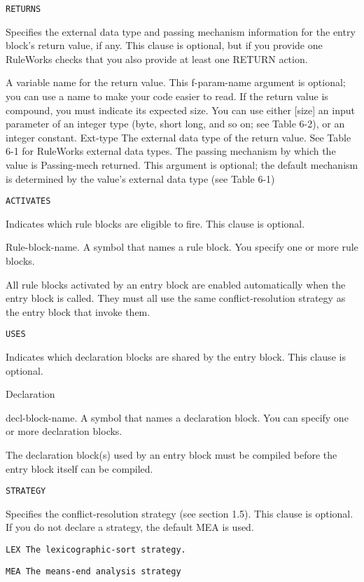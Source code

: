 \tt{RETURNS}

Specifies the external data type and passing mechanism
information for the entry block's return value, if any. This
clause is optional, but if you provide one RuleWorks checks
that you also provide at least one RETURN action.

A variable name for the return value. This
f-param-name argument is optional; you can use a name to make
your code easier to read.
If the return value is compound, you must
indicate its expected size. You can use either
[size]       an input parameter of an integer type (byte,
short long, and so on; see Table 6-2), or an
integer constant.
Ext-type     The external data type of the return value. See
Table 6-1 for RuleWorks external data types.
The passing mechanism by which the value is
Passing-mech returned. This argument is optional; the default
mechanism is determined by the value's external
data type (see Table 6-1)

\tt{ACTIVATES}

Indicates which rule blocks are eligible to fire. This clause
is optional.

Rule-block-name. A symbol that names a rule block. You
specify one or more rule blocks.

All rule blocks activated by an entry block are enabled
automatically when the entry block is called. They must all
use the same conflict-resolution strategy as the entry block
that invoke them.

\tt{USES}

Indicates which declaration blocks are shared by the entry
block. This clause is optional.

Declaration

decl-block-name.  A symbol that names a declaration block.
You can specify one or more declaration blocks.

The declaration block(s) used by an entry block must be
compiled before the entry block itself can be compiled.

\tt{STRATEGY}

Specifies the conflict-resolution strategy (see section 1.5).
This clause is optional. If you do not declare a strategy,
the default MEA is used.

\tt{LEX} The lexicographic-sort strategy.

\tt{MEA}  The means-end analysis strategy

\Example

